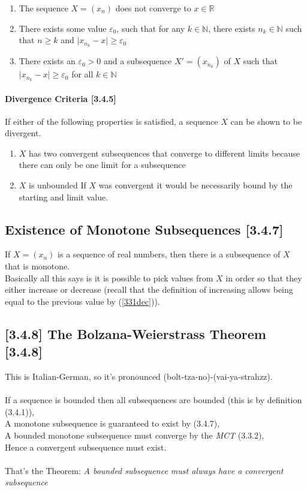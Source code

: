 \documentclass[class=article, crop=false]{standalone}
\begin{document}
\begin{enumerate}
  \item The sequence $X=(x_n)$ does not converge to $x \in \mathbb{R}$
  \item There exists some value $\varepsilon_0$, such that for any $k \in \mathbb{N}$, there exists $n_k\in \mathbb{N}$ such that $n\geq k$ and $\lvert x_{n_k} - x \rvert \geq \varepsilon_0$
  \item There exists an $\varepsilon_0 > 0$ and a subsequence $X' = \left( x_{n_{k}} \right)$ of $X$ such that $\lvert x_{n_k} - x \rvert \geq \varepsilon_0$ for all $k \in \mathbb{N}$ 
\end{enumerate}

\paragraph{Divergence Criteria [3.4.5]}
If either of the following properties is satisfied, a sequence $X$ can be shown to be divergent.

\begin{enumerate}
  \item $X$ has two convergent subsequences that converge to different limits
    \subitem because there can only be one limit for a subsequence
  \item $X$ is unbounded
    \subitem If $X$ was convergent it would be necessarily bound by the starting and limit value.
\end{enumerate}

\subsection{Existence of Monotone Subsequences [3.4.7]}
If $X = \left( x_n \right)$ is a sequence of real numbers, then there is a subsequence of $X$ that is monotone. \\
Basically all this says is it is possible to pick values from $X$ in order so that they either increase or decrease (recall that the definition of increasing allows being equal to the previous value by (\ref{331dec})).


\subsection{[3.4.8] The Bolzana-Weierstrass Theorem [3.4.8]}
This is Italian-German, so it's pronounced (bolt-tza-no)-(vai-ya-strahzz). \\
\ \\
If a sequence is bounded then all subsequences are bounded (this is by definition (3.4.1)),\\ A monotone subsequence is guaranteed to exist by (3.4.7),\\ A bounded monotone subsequence must converge by the \textit{MCT} (3.3.2),\\ Hence a convergent subsequence must exist.\\ 
\ \\ That's the Theorem: \textit{A bounded subsequence must always have a convergent subsequence}
\end{document}
